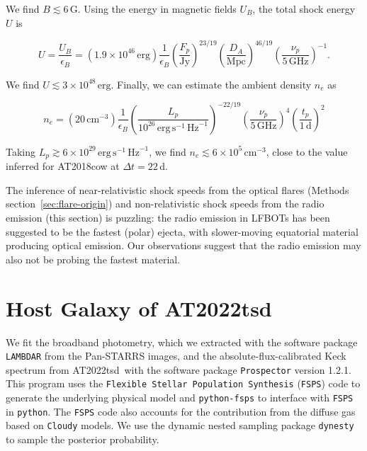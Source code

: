 \documentclass{nature_plusfigure}
\newcommand{\at}{AT2022tsd}
\begin{document}
\begin{methods}
\noindent We find $B \lesssim 6\,$G. Using the energy in magnetic fields $U_B$, the total shock energy $U$ is\cite{Ho2019}

\begin{equation}
    U = \frac{U_B}{\epsilon_B} = (1.9 \times 10^{46}\,\mathrm{erg}) \frac{1}{\epsilon_B} 
    \left(\frac{F_p}{\mathrm{Jy}}\right)^{23/19} \left(\frac{D_A}{\mathrm{Mpc}}\right)^{46/19} \left(\frac{\nu_p}{5\,\mathrm{GHz}}\right)^{-1}.
\end{equation}

\noindent We find $U\lesssim 3\times10^{48}\,\mathrm{erg}$. Finally, we can estimate the ambient density $n_e$ as\cite{Ho2019}

\begin{equation}
    n_e = (20\,\mathrm{cm}^{-3}) \frac{1}{\epsilon_B} \left(\frac{L_p}{10^{26}\,\mathrm{erg}\,\mathrm{s}^{-1}\,\mathrm{Hz}^{-1}}\right)^{-22/19} 
    \left(\frac{\nu_p}{5\,\mathrm{GHz}}\right)^{4}
    \left(\frac{t_p}{1\,\mathrm{d}}\right)^{2}
\end{equation}

\noindent Taking $L_p\gtrsim6\times10^{29}\,\mathrm{erg}\,\mathrm{s}^{-1}\,\mathrm{Hz}^{-1}$, we find $n_e\lesssim 6\times10^{5}\,\mathrm{cm}^{-3}$, close to the value inferred for AT2018cow at $\Delta t=22\,$d\cite{Ho2019}.

The inference of near-relativistic shock speeds from the optical flares (Methods section~\ref{sec:flare-origin}) and non-relativistic shock speeds from the radio emission (this section) is puzzling: the radio emission in LFBOTs has been suggested to be the fastest (polar) ejecta, with slower-moving equatorial material producing optical emission\cite{Margutti2019}. Our observations suggest that the radio emission may also not be probing the fastest material.

\section{Host Galaxy of \at}
\label{sec:hostgalaxy}

We fit the broadband photometry, which we extracted with the software package \texttt{LAMBDAR}\cite{Wright2016} from the Pan-STARRS images\cite{Chambers2016}, and the absolute-flux-calibrated Keck spectrum from \at\ with the software package \texttt{Prospector} version 1.2.1\cite{Johnson2021}. This program uses the \texttt{Flexible Stellar Population Synthesis} (\texttt{FSPS}) code\cite{Conroy2009} to generate the underlying physical model and \texttt{python-fsps}\cite{ForemanMackey2014} to interface with \texttt{FSPS} in \texttt{python}. The \texttt{FSPS} code also accounts for the contribution from the diffuse gas based on \texttt{Cloudy} models\cite{Byler2017}. We use the dynamic nested sampling package \texttt{dynesty}\cite{Speagle2020} to sample the posterior probability.


\end{methods}
\end{document}
